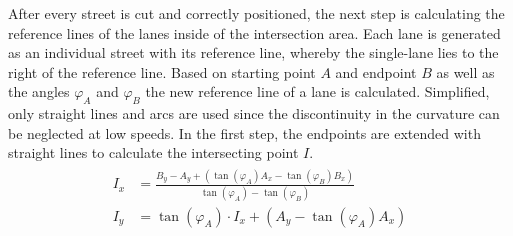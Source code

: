 \documentclass[a4paper, 10pt, conference]{ieeeconf}      %
\begin{document}
    After every street is cut and correctly positioned, the next step is calculating the reference lines of the lanes inside of the intersection area. Each lane is generated as an individual street with its reference line, whereby the single-lane lies to the right of the reference line. Based on starting point \(A\) and endpoint \(B\) as well as the angles \(\varphi_{A}\) and \(\varphi_{B}\) the new reference line of a lane is calculated. Simplified, only straight lines and arcs are used since the discontinuity in the curvature can be neglected at low speeds. In the first step, the endpoints are extended with straight lines to calculate the intersecting point \(I\). 
    \begin{align}
        \begin{split}
            I_x &= \frac{B_y - A_y + \left(\tan(\varphi_A) A_x - \tan(\varphi_B) B_x\right)}{\tan(\varphi_A) - \tan(\varphi_B)} \\
            I_y &= \tan(\varphi_A) \cdot I_x + \left(A_y - \tan(\varphi_A) A_x\right)\\
        \end{split}     
    \end{align}
\end{document}
